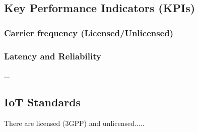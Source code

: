 \documentclass[conference]{IEEEtran}
\begin{document}

\subsection{Key Performance Indicators (KPIs)}
\subsubsection{Carrier frequency (Licensed/Unlicensed)}
\subsubsection{Latency and Reliability}
...

\subsection{IoT Standards}
There are licensed (3GPP) and unlicensed..... 
\end{document}
